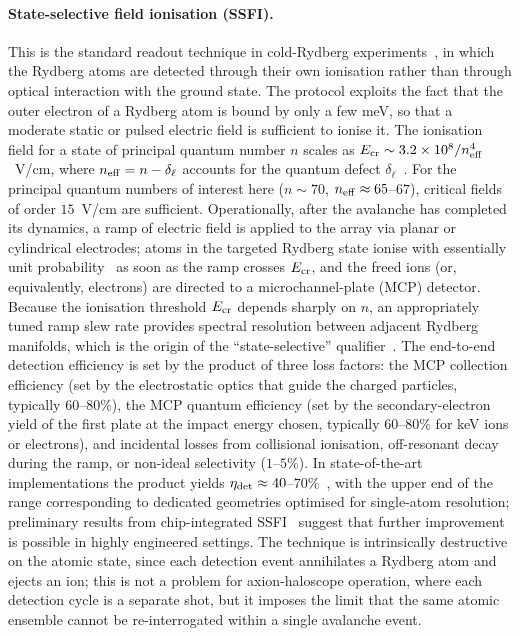 \paragraph{State-selective field ionisation (SSFI).}
This is the standard readout technique in cold-Rydberg experiments~\cite{Gallagher2005, Saffman2016}, in which the Rydberg atoms are detected through their own ionisation rather than through optical interaction with the ground state. The protocol exploits the fact that the outer electron of a Rydberg atom is bound by only a few meV, so that a moderate static or pulsed electric field is sufficient to ionise it. The ionisation field for a state of principal quantum number $n$ scales as $E_{\rm cr} \sim 3.2 \times 10^8 / n_{\rm eff}^4$~V/cm, where $n_{\rm eff} = n - \delta_\ell$ accounts for the quantum defect $\delta_\ell$~\cite{Gallagher2005}. For the principal quantum numbers of interest here ($n \sim 70$, $n_{\rm eff} \approx 65$--$67$), critical fields of order $15$~V/cm are sufficient. Operationally, after the avalanche has completed its dynamics, a ramp of electric field is applied to the array via planar or cylindrical electrodes; atoms in the targeted Rydberg state ionise with essentially unit probability~\cite{Ryabtsev2007} as soon as the ramp crosses $E_{\rm cr}$, and the freed ions (or, equivalently, electrons) are directed to a microchannel-plate (MCP) detector. Because the ionisation threshold $E_{\rm cr}$ depends sharply on $n$, an appropriately tuned ramp slew rate provides spectral resolution between adjacent Rydberg manifolds, which is the origin of the ``state-selective'' qualifier~\cite{Tada1999}. The end-to-end detection efficiency is set by the product of three loss factors: the MCP collection efficiency (set by the electrostatic optics that guide the charged particles, typically $60$--$80\%$), the MCP quantum efficiency (set by the secondary-electron yield of the first plate at the impact energy chosen, typically $60$--$80\%$ for keV ions or electrons), and incidental losses from collisional ionisation, off-resonant decay during the ramp, or non-ideal selectivity ($1$--$5\%$). In state-of-the-art implementations the product yields $\eta_{\rm det} \approx 40$--$70\%$~\cite{Ryabtsev2007, Andersen2013}, with the upper end of the range corresponding to dedicated geometries optimised for single-atom resolution; preliminary results from chip-integrated SSFI~\cite{Seery2024} suggest that further improvement is possible in highly engineered settings. The technique is intrinsically destructive on the atomic state, since each detection event annihilates a Rydberg atom and ejects an ion; this is not a problem for axion-haloscope operation, where each detection cycle is a separate shot, but it imposes the limit that the same atomic ensemble cannot be re-interrogated within a single avalanche event.

